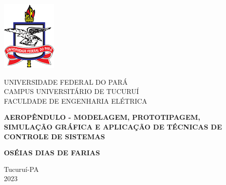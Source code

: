 	\thispagestyle{empty}
	\begin{center}

        \includegraphics[scale=0.5]{Figuras/logoufpa.png}
		
			UNIVERSIDADE FEDERAL DO PARÁ\\
			CAMPUS UNIVERSITÁRIO DE TUCURUÍ\\
			FACULDADE DE ENGENHARIA ELÉTRICA
			
			\vfill 
			
			\textbf{AEROPÊNDULO - MODELAGEM, PROTOTIPAGEM, SIMULAÇÃO GRÁFICA E APLICAÇÃO DE TÉCNICAS DE CONTROLE DE SISTEMAS}
			
			\vfill
			
			\textbf{OSÉIAS DIAS DE FARIAS}
			
			\vfill \vfill
			
	
			Tucuruí-PA\\			
			2023
			
	\end{center}

